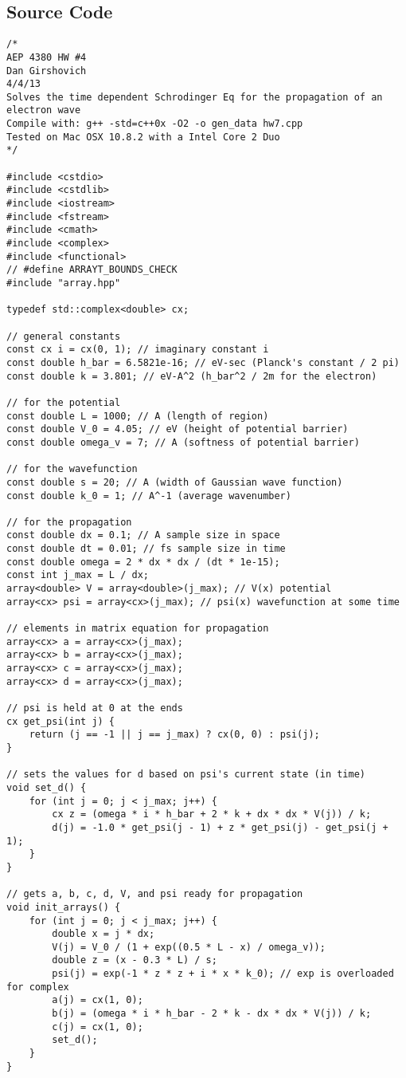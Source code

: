 \documentclass[12pt]{article}
\begin{document}
\subsection{Source Code}
\begin{lstlisting}
/*
AEP 4380 HW #4
Dan Girshovich
4/4/13
Solves the time dependent Schrodinger Eq for the propagation of an electron wave
Compile with: g++ -std=c++0x -O2 -o gen_data hw7.cpp
Tested on Mac OSX 10.8.2 with a Intel Core 2 Duo
*/

#include <cstdio>
#include <cstdlib>
#include <iostream>
#include <fstream>
#include <cmath>
#include <complex>
#include <functional>
// #define ARRAYT_BOUNDS_CHECK
#include "array.hpp"

typedef std::complex<double> cx;

// general constants
const cx i = cx(0, 1); // imaginary constant i
const double h_bar = 6.5821e-16; // eV-sec (Planck's constant / 2 pi)
const double k = 3.801; // eV-A^2 (h_bar^2 / 2m for the electron)

// for the potential
const double L = 1000; // A (length of region)
const double V_0 = 4.05; // eV (height of potential barrier)
const double omega_v = 7; // A (softness of potential barrier)

// for the wavefunction
const double s = 20; // A (width of Gaussian wave function)
const double k_0 = 1; // A^-1 (average wavenumber)

// for the propagation
const double dx = 0.1; // A sample size in space
const double dt = 0.01; // fs sample size in time
const double omega = 2 * dx * dx / (dt * 1e-15);
const int j_max = L / dx;
array<double> V = array<double>(j_max); // V(x) potential
array<cx> psi = array<cx>(j_max); // psi(x) wavefunction at some time

// elements in matrix equation for propagation
array<cx> a = array<cx>(j_max);
array<cx> b = array<cx>(j_max);
array<cx> c = array<cx>(j_max);
array<cx> d = array<cx>(j_max);

// psi is held at 0 at the ends
cx get_psi(int j) {
    return (j == -1 || j == j_max) ? cx(0, 0) : psi(j);
}

// sets the values for d based on psi's current state (in time)
void set_d() {
    for (int j = 0; j < j_max; j++) {
        cx z = (omega * i * h_bar + 2 * k + dx * dx * V(j)) / k;
        d(j) = -1.0 * get_psi(j - 1) + z * get_psi(j) - get_psi(j + 1);
    }
}

// gets a, b, c, d, V, and psi ready for propagation
void init_arrays() {
    for (int j = 0; j < j_max; j++) {
        double x = j * dx;
        V(j) = V_0 / (1 + exp((0.5 * L - x) / omega_v));
        double z = (x - 0.3 * L) / s;
        psi(j) = exp(-1 * z * z + i * x * k_0); // exp is overloaded for complex
        a(j) = cx(1, 0);
        b(j) = (omega * i * h_bar - 2 * k - dx * dx * V(j)) / k;
        c(j) = cx(1, 0);
        set_d();
    }
}


\end{lstlisting}
\end{document}
